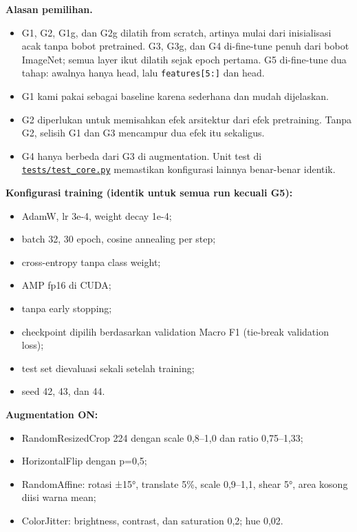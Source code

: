 \documentclass[10pt,a4paper]{article}
\providecommand{\tightlist}{\setlength{\itemsep}{2pt}\setlength{\parskip}{0pt}}
\begin{document}
\textbf{Alasan pemilihan.}

\begin{itemize}
\tightlist
\item
  G1, G2, G1g, dan G2g dilatih from scratch, artinya mulai dari inisialisasi acak tanpa bobot pretrained. G3, G3g, dan G4 di-fine-tune penuh dari bobot ImageNet; semua layer ikut dilatih sejak epoch pertama. G5 di-fine-tune dua tahap: awalnya hanya head, lalu \texttt{features{[}5:{]}} dan head.
\item
  G1 kami pakai sebagai baseline karena sederhana dan mudah dijelaskan.
\item
  G2 diperlukan untuk memisahkan efek arsitektur dari efek pretraining. Tanpa G2, selisih G1 dan G3 mencampur dua efek itu sekaligus.
\item
  G4 hanya berbeda dari G3 di augmentation. Unit test di \href{https://github.com/Universitas-Cakrawala/semarang-batik-fine-grained-transfer-learning/blob/main/tests/test_core.py}{\texttt{tests/\allowbreak{}test\_\allowbreak{}core.py}} memastikan konfigurasi lainnya benar-benar identik.
\end{itemize}

\textbf{Konfigurasi training (identik untuk semua run kecuali G5):}

\begin{itemize}
\tightlist
\item
  AdamW, lr 3e-4, weight decay 1e-4;
\item
  batch 32, 30 epoch, cosine annealing per step;
\item
  cross-entropy tanpa class weight;
\item
  AMP fp16 di CUDA;
\item
  tanpa early stopping;
\item
  checkpoint dipilih berdasarkan validation Macro F1 (tie-break validation loss);
\item
  test set dievaluasi sekali setelah training;
\item
  seed 42, 43, dan 44.
\end{itemize}

\textbf{Augmentation ON:}

\begin{itemize}
\tightlist
\item
  RandomResizedCrop 224 dengan scale 0,8--1,0 dan ratio 0,75--1,33;
\item
  HorizontalFlip dengan p=0,5;
\item
  RandomAffine: rotasi ±15°, translate 5\%, scale 0,9--1,1, shear 5°, area kosong
  diisi warna mean;
\item
  ColorJitter: brightness, contrast, dan saturation 0,2; hue 0,02.
\end{itemize}
\end{document}
